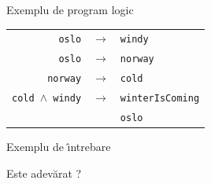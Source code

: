 \documentclass[xcolor=x11names,compress,10pt]{beamer}
\begin{document}
\begin{frame}{Exemplu de program logic}
\begin{center}
\begin{tabular}{rcl}
\texttt{oslo} & $\to$ & \texttt{windy} \\[.5em]
\texttt{oslo} & $\to$ & \texttt{norway} \\[.5em]
\texttt{norway} & $\to$ & \texttt{cold} \\[.5em]
\texttt{cold $\wedge$ windy} & $\to$ & \texttt{winterIsComing} \\[.5em]
& & \texttt{oslo}\\
\end{tabular}
\end{center}
\bigskip\pause

\begin{block}{Exemplu de \^\i ntrebare}
\begin{center}
Este adev\u arat ?
\end{center}
\end{block}
\end{frame}

\end{document}
